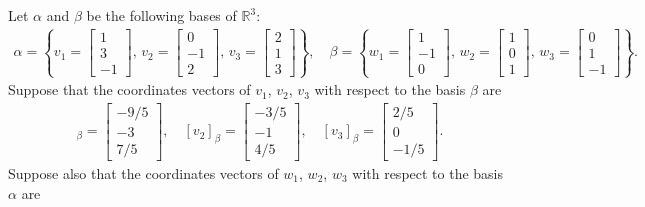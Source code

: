 \documentclass[addpoints, 12pt]{exam}%
\newcommand{\bR}{\mathbb{R}}
\theoremstyle{definition}
\begin{document}
\begin{questions}
	\newpage
	
\question

Let $\alpha$ and $\beta$ be the following bases of $\bR^3$:
	\begin{align*}
	\alpha = \left\lbrace v_1 = \begin{bmatrix} 1 \\ 3 \\ -1 \end{bmatrix} , \, v_2 = \begin{bmatrix} 0 \\ -1 \\ 2 \end{bmatrix} , \, v_3 = \begin{bmatrix} 2 \\ 1 \\ 3 \end{bmatrix} \right\rbrace , \quad \beta = \left\lbrace w_1 = \begin{bmatrix} 1 \\ -1 \\ 0 \end{bmatrix} , \, w_2 = \begin{bmatrix} 1 \\ 0 \\ 1 \end{bmatrix} , \, w_3 = \begin{bmatrix} 0 \\ 1 \\ -1 \end{bmatrix} \right\rbrace .
	\end{align*}
Suppose that the coordinates vectors of $v_1$, $v_2$, $v_3$ with respect to the basis $\beta$ are
	\begin{align*}
	[v_1]_{\beta} = \left[\begin{matrix}-9/5 \\-3\\ 7/5\end{matrix}\right] , \quad 
	[v_2]_\beta = \left[\begin{matrix}-3/5 \\-1\\ 4/5\end{matrix}\right] , \quad 
	[v_3]_\beta = \left[\begin{matrix}2/5 \\0\\- 1/5 \end{matrix}\right] .
	\end{align*}
Suppose also that the coordinates vectors of $w_1$, $w_2$, $w_3$ with respect to the basis $\alpha$ are

\end{questions}
\end{document}
